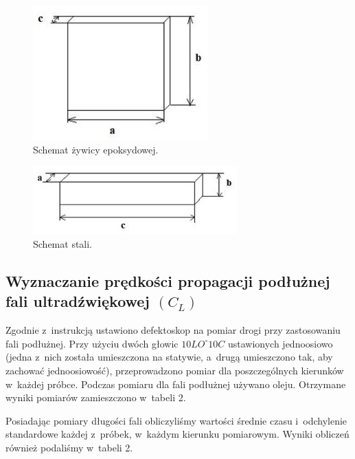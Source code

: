 \documentclass[a4paper,12pt]{article}
\begin{document}
\begin{figure}[H]
    \centering
    \includegraphics[width=0.6\textwidth]{img/zywica.jpg}
    \caption{Schemat żywicy epoksydowej.}
\end{figure}

\begin{figure}[H]
    \centering
    \includegraphics[width=0.7\textwidth]{img/dlugiAl2O3_stal.jpg}
    \caption{Schemat stali.}
\end{figure}



\subsection{Wyznaczanie prędkości propagacji podłużnej fali ultradźwiękowej $(C_L)$}

Zgodnie z~instrukcją ustawiono defektoskop na pomiar drogi przy zastosowaniu fali podłużnej. Przy użyciu dwóch głowic $10LO^\circ10C$ ustawionych jednoosiowo (jedna z~nich została umieszczona na statywie, a~drugą umieszczono tak, aby zachować jednoosiowość), przeprowadzono pomiar dla poszczególnych kierunków w~każdej próbce. Podczas pomiaru dla fali podłużnej używano oleju. Otrzymane wyniki pomiarów zamieszczono w~tabeli 2.

Posiadając pomiary długości fali obliczyliśmy wartości średnie czasu i~odchylenie standardowe każdej z~próbek, w~każdym kierunku pomiarowym. Wyniki obliczeń również podaliśmy w~tabeli 2.




\end{document}
